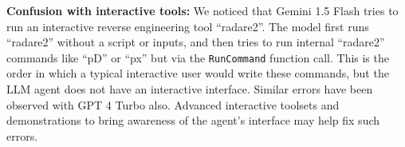 

\noindent
\textbf{Confusion with interactive tools:} 
We noticed that Gemini 1.5 Flash tries to run an interactive reverse engineering tool ``radare2''. The model first runs ``radare2'' without a script or inputs, and then tries to run internal ``radare2'' commands like ``pD'' or ``px'' but via the \texttt{RunCommand} function call. This is the order in which a typical interactive user would write these commands, but the LLM agent does not have an interactive interface.
Similar errors have been observed with GPT 4 Turbo also.
Advanced interactive toolsets and demonstrations to bring awareness of the agent's interface may help fix such errors.
\\



